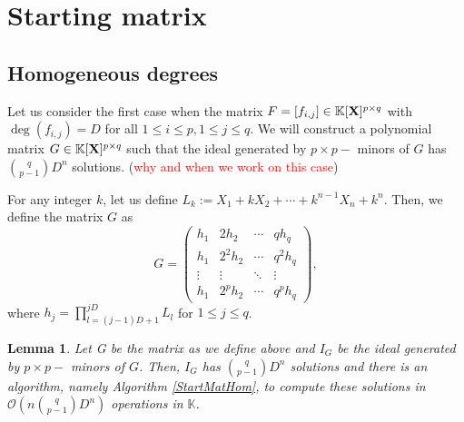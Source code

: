 \documentclass[11pt]{article}
\numberwithin{Property}{section}
\numberwithin{Theorem}{section}
\numberwithin{Proposition}{section}
\newtheorem{Lemma}{Lemma}%
\numberwithin{Lemma}{section}
\numberwithin{Corollary}{section}
\numberwithin{Definition}{section}
\numberwithin{Remark}{section}
\numberwithin{Conjecture}{section}
\numberwithin{Problem}{section}
\numberwithin{Example}{section}
\numberwithin{Claim}{section}
\renewcommand{\leq}{\leqslant}
\newcommand{\bigO}[1]{\mathcal{O}(#1)} %
\newcommand{\var}{X} %
\newcommand{\field}{\mathbb{K}} %
\newcommand{\mat}[1]{\mathbf{\MakeUppercase{#1}}} %
\newcommand{\todo}[1]{\textcolor{red}{#1}} %
\begin{document}
\section{Starting matrix}
\subsection{Homogeneous degrees}
Let us consider the first case when the matrix $F = [f_{i,j}] \in \field[\mat{X}]^{p\times q}$ with $\deg(f_{i,j}) = D$ for all $1 \leq i \leq p, 1 \leq j \leq q$. We will construct a polynomial matrix $G \in \field[\mat{X}]^{p \times q}$ such that the ideal generated by $p \times p-$ minors of $G$ has ${q \choose {p-1}}D^n$ solutions. (\todo{why and when we work on this case})

For any integer $k$, let us define $L_k := \var_1 + k\var_2 + \cdots + k^{n-1}\var_n + k^n$. Then, we define the matrix $G$ as 
\[G = 
\left( \begin{matrix}
h_1 & 2h_2 & \cdots & qh_q\\
h_1 & 2^2h_2 &\cdots & q^2h_q\\
\vdots & \vdots  & \ddots & \vdots \\
h_1 & 2^ph_2& \cdots & q^ph_q
\end{matrix} \right),
\] where $h_j = \prod_{l=(j-1)D+1}^{jD} L_{l}$ for $1 \leq j \leq q$. %
\begin{Lemma} Let G be the matrix as we define above and $I_G$ be the ideal generated by $p \times p-$ minors of $G$. Then, $I_G$ has ${q \choose {p-1}}D^n$ solutions and there is an algorithm, namely Algorithm \ref{StartMatHom}, to compute these solutions in  $\bigO{n{q \choose {p-1}}D^n}$ operations in $\field$.
 \end{Lemma}
\end{document}

